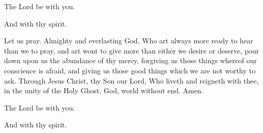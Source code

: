 


\rubric{\Vbar}The Lord be with you.

\rubric{\Rbar}And with thy spirit.

Let us pray.
Almighty and everlasting God, Who art always more ready to hear than we to pray, and art wont to give more than either we desire or deserve, pour down upon us the abundance of thy mercy, forgiving us those things whereof our conscience is afraid, and giving us those good things which we are not worthy to ask. Through Jesus Christ, thy Son our Lord, Who liveth and reigneth with thee, in the unity of the Holy Ghost, God, world without end.\rubric{\Rbar} Amen.

\rubric{\Vbar}The Lord be with you.

\rubric{\Rbar}And with thy spirit.